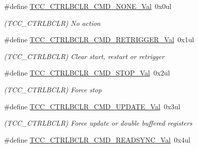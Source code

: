 \begin{DoxyCompactItemize}
\item 
\hypertarget{group___s_a_m_l21___t_c_c_ga6487842fdbdc4611ec51f7b8d14a4793}{}\#define \hyperlink{group___s_a_m_l21___t_c_c_ga6487842fdbdc4611ec51f7b8d14a4793}{T\+C\+C\+\_\+\+C\+T\+R\+L\+B\+C\+L\+R\+\_\+\+C\+M\+D\+\_\+\+N\+O\+N\+E\+\_\+\+Val}~0x0ul\label{group___s_a_m_l21___t_c_c_ga6487842fdbdc4611ec51f7b8d14a4793}

\begin{DoxyCompactList}\small\item\em (T\+C\+C\+\_\+\+C\+T\+R\+L\+B\+C\+L\+R) No action \end{DoxyCompactList}\item 
\hypertarget{group___s_a_m_l21___t_c_c_gafd176e0bf11648db1508e16fd14604b3}{}\#define \hyperlink{group___s_a_m_l21___t_c_c_gafd176e0bf11648db1508e16fd14604b3}{T\+C\+C\+\_\+\+C\+T\+R\+L\+B\+C\+L\+R\+\_\+\+C\+M\+D\+\_\+\+R\+E\+T\+R\+I\+G\+G\+E\+R\+\_\+\+Val}~0x1ul\label{group___s_a_m_l21___t_c_c_gafd176e0bf11648db1508e16fd14604b3}

\begin{DoxyCompactList}\small\item\em (T\+C\+C\+\_\+\+C\+T\+R\+L\+B\+C\+L\+R) Clear start, restart or retrigger \end{DoxyCompactList}\item 
\hypertarget{group___s_a_m_l21___t_c_c_ga8fb1e134b7238155403248d68e911e0b}{}\#define \hyperlink{group___s_a_m_l21___t_c_c_ga8fb1e134b7238155403248d68e911e0b}{T\+C\+C\+\_\+\+C\+T\+R\+L\+B\+C\+L\+R\+\_\+\+C\+M\+D\+\_\+\+S\+T\+O\+P\+\_\+\+Val}~0x2ul\label{group___s_a_m_l21___t_c_c_ga8fb1e134b7238155403248d68e911e0b}

\begin{DoxyCompactList}\small\item\em (T\+C\+C\+\_\+\+C\+T\+R\+L\+B\+C\+L\+R) Force stop \end{DoxyCompactList}\item 
\hypertarget{group___s_a_m_l21___t_c_c_ga17b5fd2fdc89e651857bf5bf381be5d1}{}\#define \hyperlink{group___s_a_m_l21___t_c_c_ga17b5fd2fdc89e651857bf5bf381be5d1}{T\+C\+C\+\_\+\+C\+T\+R\+L\+B\+C\+L\+R\+\_\+\+C\+M\+D\+\_\+\+U\+P\+D\+A\+T\+E\+\_\+\+Val}~0x3ul\label{group___s_a_m_l21___t_c_c_ga17b5fd2fdc89e651857bf5bf381be5d1}

\begin{DoxyCompactList}\small\item\em (T\+C\+C\+\_\+\+C\+T\+R\+L\+B\+C\+L\+R) Force update or double buffered registers \end{DoxyCompactList}\item 
\hypertarget{group___s_a_m_l21___t_c_c_ga14d520b1455dd689144ab0f47d3950ac}{}\#define \hyperlink{group___s_a_m_l21___t_c_c_ga14d520b1455dd689144ab0f47d3950ac}{T\+C\+C\+\_\+\+C\+T\+R\+L\+B\+C\+L\+R\+\_\+\+C\+M\+D\+\_\+\+R\+E\+A\+D\+S\+Y\+N\+C\+\_\+\+Val}~0x4ul\label{group___s_a_m_l21___t_c_c_ga14d520b1455dd689144ab0f47d3950ac}


\end{DoxyCompactItemize}
